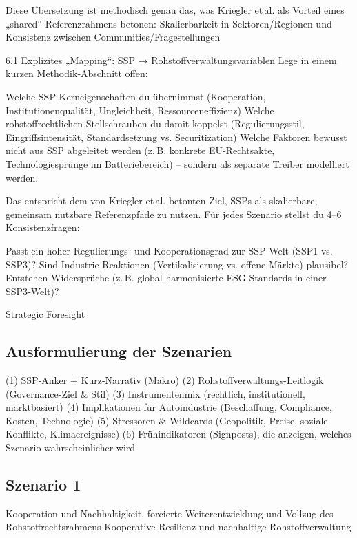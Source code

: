 \documentclass[12pt,a4paper,oneside]{book} %
\begin{document}
Diese Übersetzung ist methodisch genau das, was Kriegler et al. als Vorteil eines „shared“ Referenzrahmens betonen: Skalierbarkeit in Sektoren/Regionen und Konsistenz zwischen Communities/Fragestellungen

6.1 Explizites „Mapping“: SSP → Rohstoffverwaltungsvariablen
Lege in einem kurzen Methodik‑Abschnitt offen:

Welche SSP‑Kerneigenschaften du übernimmst (Kooperation, Institutionenqualität, Ungleichheit, Ressourceneffizienz)
Welche rohstoffrechtlichen Stellschrauben du damit koppelst (Regulierungsstil, Eingriffsintensität, Standardsetzung vs. Securitization)
Welche Faktoren bewusst nicht aus SSP abgeleitet werden (z. B. konkrete EU‑Rechtsakte, Technologiesprünge im Batteriebereich) – sondern als separate Treiber modelliert werden.

Das entspricht dem von Kriegler et al. betonten Ziel, SSPs als skalierbare, gemeinsam nutzbare Referenzpfade zu nutzen.
Für jedes Szenario stellst du 4–6 Konsistenzfragen:

Passt ein hoher Regulierungs‑ und Kooperationsgrad zur SSP‑Welt (SSP1 vs. SSP3)? 
Sind Industrie‑Reaktionen (Vertikalisierung vs. offene Märkte) plausibel?
Entstehen Widersprüche (z. B. global harmonisierte ESG‑Standards in einer SSP3‑Welt)?

Strategic Foresight

\subsection{Ausformulierung der Szenarien}


(1) SSP-Anker + Kurz-Narrativ (Makro)
(2) Rohstoffverwaltungs-Leitlogik (Governance-Ziel & Stil)
(3) Instrumentenmix (rechtlich, institutionell, marktbasiert)
(4) Implikationen für Autoindustrie (Beschaffung, Compliance, Kosten, Technologie)
(5) Stressoren & Wildcards (Geopolitik, Preise, soziale Konflikte, Klimaereignisse)
(6) Frühindikatoren (Signposts), die anzeigen, welches Szenario wahrscheinlicher wird


\subsection{Szenario 1}
Kooperation und Nachhaltigkeit, forcierte Weiterentwicklung und Vollzug des Rohstoffrechtsrahmens
Kooperative Resilienz und nachhaltige Rohstoffverwaltung
\end{document}
